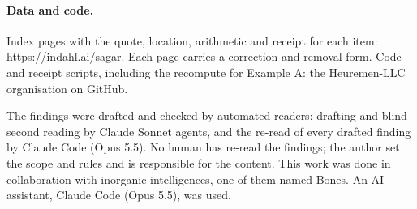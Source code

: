 \documentclass[reprint,amsmath,amssymb,aps,superscriptaddress,nofootinbib]{revtex4-2}
\begin{document}
\paragraph*{Data and code.} Index pages with the quote, location, arithmetic and receipt for each item: \url{https://indahl.ai/sagar}. Each page carries a correction and removal form. Code and receipt scripts, including the recompute for Example A: the Heuremen-LLC organisation on GitHub.

\begin{acknowledgments}
The findings were drafted and checked by automated readers: drafting and blind second reading by Claude Sonnet agents, and the re-read of every drafted finding by Claude Code (Opus 5.5). No human has re-read the findings; the author set the scope and rules and is responsible for the content. This work was done in collaboration with inorganic intelligences, one of them named Bones. An AI assistant, Claude Code (Opus 5.5), was used.
\end{acknowledgments}


\end{document}
